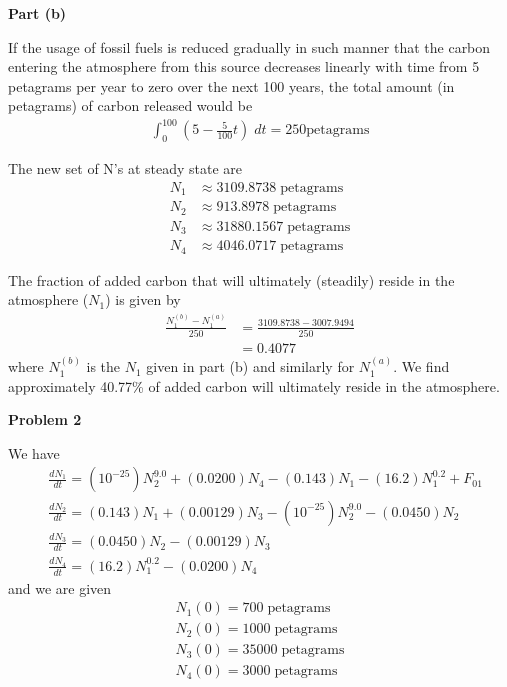\documentclass[final,12pt,reqno]{amsart}
\begin{document}
\textbf{Part (b)}

If the usage of fossil fuels is reduced gradually in such manner that the carbon entering the atmosphere from this source decreases linearly with time from 5 petagrams per year to zero over the next 100 years, the total amount (in petagrams) of carbon released would be
\begin{align*}
	\int_{0}^{100} (5 - \frac{5}{100}t)\; dt = 250 \text{petagrams}
\end{align*}

The new set of N's at steady state are
\begin{align*}
	N_1 &\approx 3109.8738 \; \text{petagrams}\\
	N_2 &\approx 913.8978 \; \text{petagrams}\\
	N_3 &\approx 31880.1567 \; \text{petagrams}\\
	N_4 &\approx 4046.0717 \; \text{petagrams}
\end{align*}

The fraction of added carbon that will ultimately (steadily) reside in the atmosphere ($N_1$) is given by
\begin{align*}
	\frac{N_1^{(b)} - N_1^{(a)}}{250} &= \frac{3109.8738 - 3007.9494}{250}\\
									  &= 0.4077
\end{align*}
where $N_1^{(b)}$ is the $N_1$ given in part (b) and similarly for $N_1^{(a)}$. We find approximately 40.77\% of added carbon will ultimately reside in the atmosphere.

\textbf{Problem 2}

We have
\begin{align*}
	&\frac{dN_1}{dt} = (10^{-25})N_2^{9.0} + (0.0200)N_4 - (0.143)N_1 - (16.2)N_1^{0.2} + F_{01}\\
	&\frac{dN_2}{dt} = (0.143)N_1 + (0.00129)N_3 - (10^{-25})N_2^{9.0} - (0.0450)N_2\\
	&\frac{dN_3}{dt} = (0.0450)N_2 - (0.00129)N_3\\
	&\frac{dN_4}{dt} = (16.2)N_1^{0.2} - (0.0200)N_4
\end{align*}
and we are given
\begin{align*}
	N_1(0) = 700 \; \text{petagrams}\\
	N_2(0) = 1000 \; \text{petagrams}\\
	N_3(0) = 35000 \; \text{petagrams}\\
	N_4(0) = 3000 \; \text{petagrams}
\end{align*}
\end{document}
